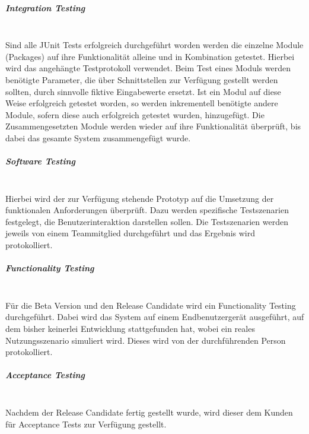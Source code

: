\documentclass[10pt,a4paper]{article}
\begin{document}
\subparagraph{Integration Testing}\ \\
Sind alle JUnit Tests erfolgreich durchgeführt worden werden die einzelne Module (Packages) auf ihre Funktionalität alleine und in Kombination getestet. Hierbei wird das angehängte Testprotokoll verwendet. Beim Test eines Moduls werden benötigte Parameter, die über Schnittstellen zur Verfügung gestellt werden sollten, durch sinnvolle fiktive Eingabewerte ersetzt. Ist ein Modul auf diese Weise erfolgreich getestet worden, so werden inkrementell benötigte andere Module, sofern diese auch erfolgreich getestet wurden, hinzugefügt. Die Zusammengesetzten Module werden wieder auf ihre Funktionalität überprüft, bis dabei das gesamte System zusammengefügt wurde.

\subparagraph{Software Testing}\ \\
Hierbei wird der zur Verfügung stehende Prototyp auf die Umsetzung der funktionalen Anforderungen überprüft. Dazu werden spezifische Testszenarien festgelegt, die Benutzerinteraktion darstellen sollen. Die Testszenarien werden jeweils von einem Teammitglied durchgeführt und das Ergebnis wird protokolliert. 

\subparagraph{Functionality Testing}\ \\
Für die Beta Version und den Release Candidate wird ein Functionality Testing durchgeführt. Dabei wird das System auf einem Endbenutzergerät ausgeführt, auf dem bisher keinerlei Entwicklung stattgefunden hat, wobei ein reales Nutzungsszenario simuliert wird. Dieses wird von der durchführenden Person protokolliert.

\subparagraph{Acceptance Testing}\ \\
Nachdem der Release Candidate fertig gestellt wurde, wird dieser dem Kunden für Acceptance Tests zur Verfügung gestellt. 
\end{document}
